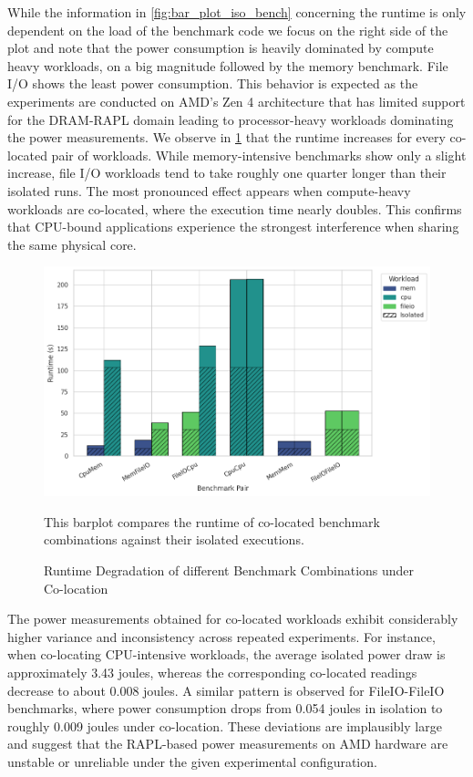 While the information in \ref{fig:bar_plot_iso_bench} concerning the runtime is only dependent on the load of the benchmark code we focus on the right side of the plot and note that the power consumption is heavily dominated by compute heavy workloads, on a big magnitude followed by the memory benchmark. File I/O shows the least power consumption. This behavior is expected as the experiments are conducted on AMD's Zen 4 architecture that has limited support for the DRAM-RAPL domain leading to processor-heavy workloads dominating the power measurements.
We observe in \ref{fig:bar_plot_colo_bench} that the runtime increases for every co-located pair of workloads. While memory-intensive benchmarks show only a slight increase, file I/O workloads tend to take roughly one quarter longer than their isolated runs. The most pronounced effect appears when compute-heavy workloads are co-located, where the execution time nearly doubles. This confirms that CPU-bound applications experience the strongest interference when sharing the same physical core.

\begin{figure}[H]
    \includegraphics[scale=0.5]{fig/06/06-barplot-colo-bench.png}
    \small
    \caption{Runtime Degradation of different Benchmark Combinations under Co-location}
    \label{fig:bar_plot_colo_bench}
    \tiny
    This barplot compares the runtime of co-located benchmark combinations against their isolated executions.
\end{figure}

The power measurements obtained for co-located workloads exhibit considerably higher variance and inconsistency across repeated experiments. For instance, when co-locating CPU-intensive workloads, the average isolated power draw is approximately 3.43 joules, whereas the corresponding co-located readings decrease to about 0.008 joules. A similar pattern is observed for FileIO-FileIO benchmarks, where power consumption drops from 0.054 joules in isolation to roughly 0.009 joules under co-location. These deviations are implausibly large and suggest that the RAPL-based power measurements on AMD hardware are unstable or unreliable under the given experimental configuration.

